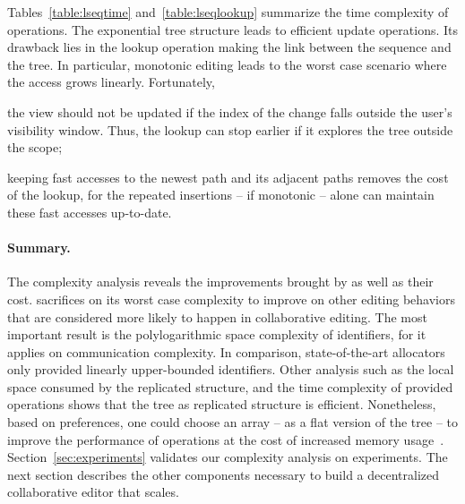 Tables~\ref{table:lseqtime} and~\ref{table:lseqlookup} summarize the time
complexity of operations. The exponential tree structure leads to efficient
update operations. Its drawback lies in the lookup operation making the link
between the sequence and the tree. In particular, monotonic editing leads to the
worst case scenario where the access grows linearly. Fortunately,
\begin{inparaenum}[(i)]
\item the view should not be updated if the index of the change falls outside
  the user's visibility window. Thus, the lookup can stop earlier if it explores
  the tree outside the scope;
\item keeping fast accesses to the newest path and its adjacent paths removes
  the cost of the lookup, for the repeated insertions -- if monotonic -- alone
  can maintain these fast accesses up-to-date.
\end{inparaenum}

\paragraph{Summary.}

The complexity analysis reveals the improvements brought by \LSEQ as well as
their cost.  \LSEQ sacrifices on its worst case complexity to improve on other
editing behaviors that are considered more likely to happen in collaborative
editing. The most important result is the polylogarithmic space complexity of
identifiers, for it applies on communication complexity. In comparison,
state-of-the-art allocators~\cite{preguica2009commutative, weiss2009logoot} only
provided linearly upper-bounded identifiers. Other analysis such as the local
space consumed by the replicated structure, and the time complexity of provided
operations shows that the tree as replicated structure is
efficient. Nonetheless, based on preferences, one could choose an array -- as a
flat version of the tree -- to improve the performance of operations at the cost
of increased memory usage~\cite{weiss2009logoot}.  Section~\ref{sec:experiments}
validates our complexity analysis on experiments. The next section describes the
other components necessary to build a decentralized collaborative editor that
scales.


